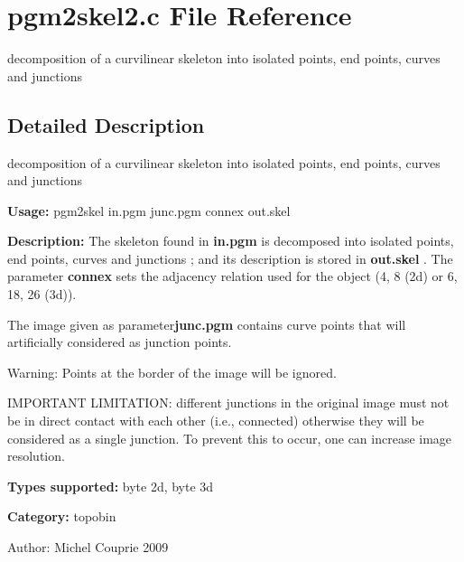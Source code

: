 \section{pgm2skel2.c File Reference}
\label{pgm2skel2_8c}
decomposition of a curvilinear skeleton into isolated points, end points, curves and junctions  




\label{_details}
\subsection{Detailed Description}
decomposition of a curvilinear skeleton into isolated points, end points, curves and junctions 

{\bf Usage:} pgm2skel in.pgm junc.pgm connex out.skel

{\bf Description:} The skeleton found in {\bf in.pgm} is decomposed into isolated points, end points, curves and junctions ; and its description is stored in {\bf out.skel} . The parameter {\bf connex} sets the adjacency relation used for the object (4, 8 (2d) or 6, 18, 26 (3d)).

The image given as parameter{\bf junc.pgm} contains curve points that will artificially considered as junction points.

\begin{Desc}
\item[Warning:]Points at the border of the image will be ignored.

IMPORTANT LIMITATION: different junctions in the original image must not be in direct contact with each other (i.e., connected) otherwise they will be considered as a single junction. To prevent this to occur, one can increase image resolution.\end{Desc}
{\bf Types supported:} byte 2d, byte 3d

{\bf Category:} topobin

\begin{Desc}
\item[Author:]Michel Couprie 2009 \end{Desc}
